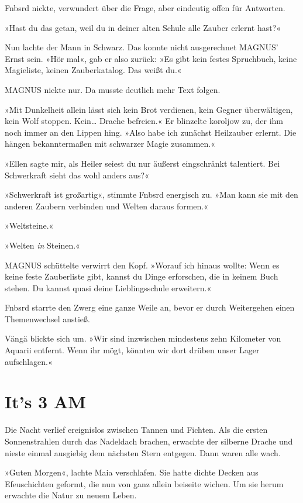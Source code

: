 Fnbsrd nickte, verwundert über die Frage, aber eindeutig offen für Antworten.

»Hast du das getan, weil du in deiner alten Schule alle Zauber erlernt hast?«

Nun lachte der Mann in Schwarz. Das konnte nicht ausgerechnet MAGNUS’ Ernst sein. »Hör mal«, gab er also zurück: »Es gibt kein festes Spruchbuch, keine Magieliste, keinen Zauberkatalog. Das weißt du.«

MAGNUS nickte nur. Da musste deutlich mehr Text folgen.

»Mit Dunkelheit allein lässt sich kein Brot verdienen, kein Gegner überwältigen, kein Wolf stoppen. Kein… Drache befreien.« Er blinzelte koroljow zu, der ihm noch immer an den Lippen hing. »Also habe ich zunächst Heilzauber erlernt. Die hängen bekanntermaßen mit schwarzer Magie zusammen.«

»Ellen sagte mir, als Heiler seiest du nur äußerst eingschränkt talentiert. Bei Schwerkraft sieht das wohl anders aus?«

»Schwerkraft ist großartig«, stimmte Fnbsrd energisch zu. »Man kann sie mit den anderen Zaubern verbinden und Welten daraus formen.«

»Weltsteine.«

»Welten \emph{in} Steinen.«

MAGNUS schüttelte verwirrt den Kopf. »Worauf ich hinaus wollte: Wenn es keine feste Zauberliste gibt, kannst du Dinge erforschen, die in keinem Buch stehen. Du kannst quasi deine Lieblingsschule erweitern.«

Fnbsrd starrte den Zwerg eine ganze Weile an, bevor er durch Weitergehen einen Themenwechsel anstieß.

Vängä blickte sich um. »Wir sind inzwischen mindestens zehn Kilometer von Aquarii entfernt. Wenn ihr mögt, könnten wir dort drüben unser Lager aufschlagen.«


\chapter{It's 3 AM}

Die Nacht verlief ereignislos zwischen Tannen und Fichten. Als die ersten Sonnenstrahlen durch das Nadeldach brachen, erwachte der silberne Drache und nieste einmal ausgiebig dem nächsten Stern entgegen. Dann waren alle wach.

»Guten Morgen«, lachte Maia verschlafen. Sie hatte dichte Decken aus Efeuschichten geformt, die nun von ganz allein beiseite wichen. Um sie herum erwachte die Natur zu neuem Leben.

